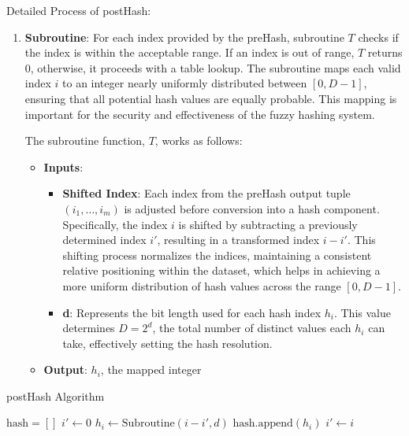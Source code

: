 Detailed Process of postHash:
\begin{enumerate}
    \item \textbf{Subroutine}: For each index provided by the preHash, subroutine \(T\) checks if the index is within the acceptable range. If an index is out of range, \(T\) returns 0, otherwise, it proceeds with a table lookup. The subroutine maps each valid index \(i\) to an integer nearly uniformly distributed between \([0, D-1]\), ensuring that all potential hash values are equally probable. This mapping is important for the security and effectiveness of the fuzzy hashing system.
    
    The subroutine function, \(T\), works as follows:
    \begin{itemize}
        \item \textbf{Inputs}: 
        \begin{itemize}
            \item \textbf{Shifted Index}: Each index from the preHash output tuple \((i_1, \ldots, i_m)\) is adjusted before conversion into a hash component. Specifically, the index \(i\) is shifted by subtracting a previously determined index \(i'\), resulting in a transformed index \(i - i'\). This shifting process normalizes the indices, maintaining a consistent relative positioning within the dataset, which helps in achieving a more uniform distribution of hash values across the range \([0, D-1]\).
            \item \textbf{d}: Represents the bit length used for each hash index \(h_i\). This value determines \(D = 2^d\), the total number of distinct values each \(h_i\) can take, effectively setting the hash resolution.
        \end{itemize}
        \item \textbf{Output}: \(h_i\), the mapped integer
    \end{itemize}
\end{enumerate}

\vspace{20pt}

\begin{algorithm}
    \begin{algorithmic}[1]
    \caption{postHash Algorithm}
    \label{postHash Algorithm}
    \State $\text{hash} = []$
    \State $i' \gets 0$
        \State $h_i \gets \text{Subroutine}(i - i', d)$
        \State $\text{hash.append}(h_i)$
        \State $i' \gets i$
    \EndFor 
    \State {}
    \EndFunction
    \end{algorithmic}
    \end{algorithm}
    
